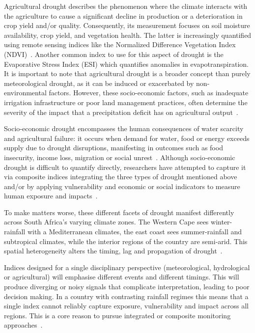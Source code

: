 Agricultural drought describes the phenomenon where the climate interacts with the agriculture to cause a significant decline in production or a deterioration in crop yield and/or quality. Consequently, its measurement focuses on soil moisture availability, crop yield, and vegetation health. The latter is increasingly quantified using remote sensing indices like the Normalized Difference Vegetation Index (NDVI)~\cite{judith2025remote}. Another common index to use for this aspect of drought is the Evaporative Stress Index (ESI) which quantifies anomalies in evapotranspiration. It is important to note that agricultural drought is a broader concept than purely meteorological drought, as it can be induced or exacerbated by non-environmental factors. However, these socio-economic factors, such as inadequate irrigation infrastructure or poor land management practices, often determine the severity of the impact that a precipitation deficit has on agricultural output~\cite{ndvi_seminal_paper, Maracchi2000, wmo_indice_guide, esi_seminal_paper}.

Socio‐economic drought encompasses the human consequences of water scarcity and agricultural failure: it occurs when demand for water, food or energy exceeds supply due to drought disruptions, manifesting in outcomes such as food insecurity, income loss, migration or social unrest~\cite{w17071002}. Although socio‐economic drought is difficult to quantify directly, researchers have attempted to capture it via composite indices integrating the three types of drought mentioned above and/or by applying vulnerability and economic or social indicators to measure human exposure and impacts~\cite{WANG2022131248,Mehran+etAll, wmo_indice_guide}.

To make matters worse, these different facets of drought manifest differently across South Africa’s varying climate zones. The Western Cape sees winter-rainfall with a Mediterranean climates, the east coast sees summer-rainfall and subtropical climates, while the interior regions of the country are semi-arid. This spatial heterogeneity alters the timing, lag and propagation of drought~\cite{za_drought_review2, mulenga}.

Indices designed for a single disciplinary perspective (meteorological, hydrological or agricultural) will emphasise different events and different timings. This will produce diverging or noisy signals that complicate interpretation, leading to poor decision making. In a country with contrasting rainfall regimes this means that a single index cannot reliably capture exposure, vulnerability and impact across all regions. This is a core reason to pursue integrated or composite monitoring approaches~\cite{Drought.gov}. 


